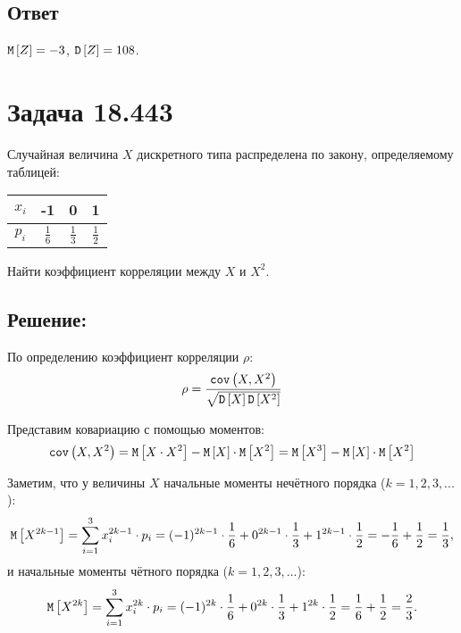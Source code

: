 \subsection*{Ответ}
$\mathtt{M} \left [ Z \right ] = -3$, $\mathtt{D} \left [ Z \right ] = 108$.

\section*{Задача 18.443}

Случайная величина $X$ дискретного типа распределена по закону, определяемому таблицей:

\begin{tabular}{|c|c|c|c|}
    \hline
    $x_i$ & -1            & 0             & 1             \\
    \hline
    $p_i$ & $\frac{1}{6}$ & $\frac{1}{3}$ & $\frac{1}{2}$ \\
    \hline
\end{tabular}

Найти коэффициент корреляции между $X$ и $X^2$.

\subsection*{Решение:}

По определению коэффициент корреляции $\rho$:
\begin{equation}
    \rho = \frac{\texttt{cov} \left ( X , X^2 \right )}{\sqrt{\mathtt{D} \left [ X \right ] \mathtt{D} \left [ X^2 \right ]}}
\end{equation}

Представим ковариацию с помощью моментов:
\begin{equation}
    \texttt{cov} \left ( X , X^2 \right )
    = \mathtt{M} \left [ X \cdot X^2 \right ] - \mathtt{M} \left [ X \right ] \cdot \mathtt{M} \left [ X^2 \right ]
    = \mathtt{M} \left [ X^3 \right ] - \mathtt{M} \left [ X \right ] \cdot \mathtt{M} \left [ X^2 \right ]
\end{equation}

Заметим, что у величины $X$ начальные моменты нечётного порядка ($k=1,2,3,...$):
\begin{equation}
    \mathtt{M} \left [ X^{2k-1} \right ] = \sum_{i=1}^3 x_i^{2k-1} \cdot p_i = (-1)^{2k-1} \cdot \frac{1}{6} + 0^{2k-1} \cdot \frac{1}{3} + 1^{2k-1} \cdot \frac{1}{2} = - \frac{1}{6} + \frac{1}{2} = \frac{1}{3} ,
\end{equation}
и начальные моменты чётного порядка ($k=1,2,3,...$):
\begin{equation}
    \mathtt{M} \left [ X^{2k} \right ] = \sum_{i=1}^3 x_i^{2k} \cdot p_i = (-1)^{2k} \cdot \frac{1}{6} + 0^{2k} \cdot \frac{1}{3} + 1^{2k} \cdot \frac{1}{2} = \frac{1}{6} + \frac{1}{2} = \frac{2}{3} .
\end{equation}

